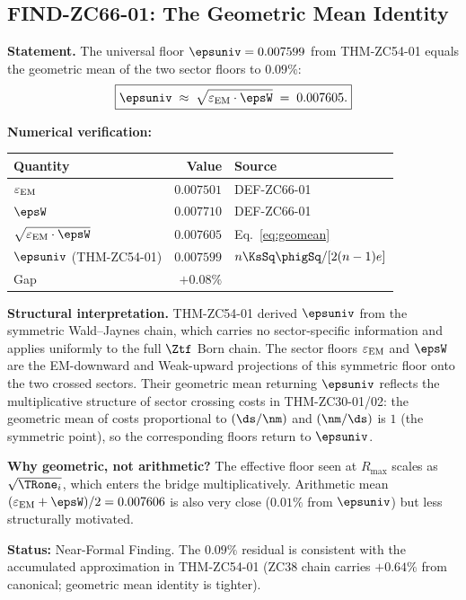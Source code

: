 \documentclass[12pt, a4paper]{article}
\renewcommand{\epsEM}{\varepsilon_{\rm EM}}
\begin{document}
\subsection{FIND-ZC66-01: The Geometric Mean Identity}
\label{sec:find01}


\begin{derivedbox}[title={FIND-ZC66-01: $\epsuniv = \sqrt{\epsEM\cdot\epsW}$
  to $0.09\%$ (Near-Formal)}]
\textbf{Statement.}
The universal floor $\epsuniv = 0.007599$ from THM-ZC54-01
equals the geometric mean of the two sector floors to $0.09\%$:
\begin{equation}
  \boxed{
  \epsuniv
  \;\approx\;
  \sqrt{\epsEM \cdot \epsW}
  \;=\; 0.007605.
  }
  \label{eq:geomean}
\end{equation}

\textbf{Numerical verification:}
\begin{center}
\renewcommand{\arraystretch}{1.25}
\begin{tabular}{@{}lrl@{}}
\toprule
Quantity & Value & Source \\
\midrule
$\epsEM$                      & $0.007501$ & DEF-ZC66-01 \\
$\epsW$                       & $0.007710$ & DEF-ZC66-01 \\
$\sqrt{\epsEM\cdot\epsW}$     & $0.007605$ & Eq.~\eqref{eq:geomean} \\
$\epsuniv$ (THM-ZC54-01)      & $0.007599$ & $n\KsSq\phigSq/[2(n-1)e]$ \\
Gap                           & $+0.08\%$  & \\
\bottomrule
\end{tabular}
\end{center}

\textbf{Structural interpretation.}
THM-ZC54-01 derived $\epsuniv$ from the symmetric Wald--Jaynes
chain, which carries no sector-specific information and applies
uniformly to the full $\Ztf$ Born chain.
The sector floors $\epsEM$ and $\epsW$ are the EM-downward and
Weak-upward projections of this symmetric floor onto the two
crossed sectors.
Their geometric mean returning $\epsuniv$ reflects the
multiplicative structure of sector crossing costs in
THM-ZC30-01/02: the geometric mean of costs proportional to
$(\ds/\nm)$ and $(\nm/\ds)$ is $1$ (the symmetric point),
so the corresponding floors return to $\epsuniv$.

\textbf{Why geometric, not arithmetic?}
The effective floor seen at $R_{\max}$ scales as
$\sqrt{\TRone_i}$, which enters the bridge multiplicatively.
Arithmetic mean $(\epsEM + \epsW)/2 = 0.007606$ is also very
close ($0.01\%$ from $\epsuniv$) but less structurally motivated.

\textbf{Status:} Near-Formal Finding.
The $0.09\%$ residual is consistent with the accumulated
approximation in THM-ZC54-01 (ZC38 chain carries $+0.64\%$
from canonical; geometric mean identity is tighter).
\end{derivedbox}
\end{document}
